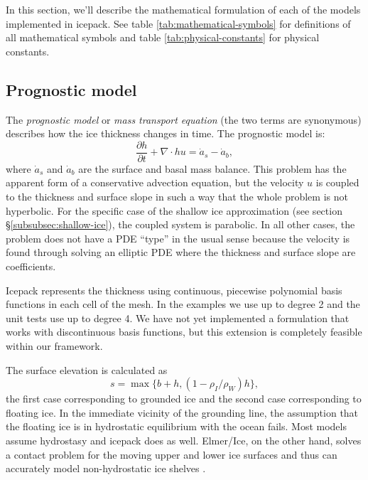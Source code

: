\documentclass[journal abbreviation, manuscript]{copernicus}
\begin{document}
In this section, we'll describe the mathematical formulation of each of the models implemented in icepack.
See table \ref{tab:mathematical-symbols} for definitions of all mathematical symbols and table \ref{tab:physical-constants} for physical constants.

\subsection{Prognostic model}

The \emph{prognostic model} or \emph{mass transport equation} (the two terms are synonymous) describes how the ice thickness changes in time.
The prognostic model is:
\begin{equation}
    \frac{\partial h}{\partial t} + \nabla\cdot hu = \dot a_s - \dot a_b,
    \label{eq:prognostic-eqn}
\end{equation}
where $\dot a_s$ and $\dot a_b$ are the surface and basal mass balance.
This problem has the apparent form of a conservative advection equation, but the velocity $u$ is coupled to the thickness and surface slope in such a way that the whole problem is not hyperbolic.
For the specific case of the shallow ice approximation (see section \S\ref{subsubsec:shallow-ice}), the coupled system is parabolic.
In all other cases, the problem does not have a PDE ``type'' in the usual sense because the velocity is found through solving an elliptic PDE where the thickness and surface slope are coefficients.

Icepack represents the thickness using continuous, piecewise polynomial basis functions in each cell of the mesh.
In the examples we use up to degree 2 and the unit tests use up to degree 4.
We have not yet implemented a formulation that works with discontinuous basis functions, but this extension is completely feasible within our framework.

The surface elevation is calculated as
\begin{equation}
    s = \max\{b + h, (1 - \rho_I / \rho_W)h\},
\end{equation}
the first case corresponding to grounded ice and the second case corresponding to floating ice.
In the immediate vicinity of the grounding line, the assumption that the floating ice is in hydrostatic equilibrium with the ocean fails.
Most models assume hydrostasy and icepack does as well.
Elmer/Ice, on the other hand, solves a contact problem for the moving upper and lower ice surfaces and thus can accurately model non-hydrostatic ice shelves \citep{gagliardini2013capabilities}.
\end{document}

